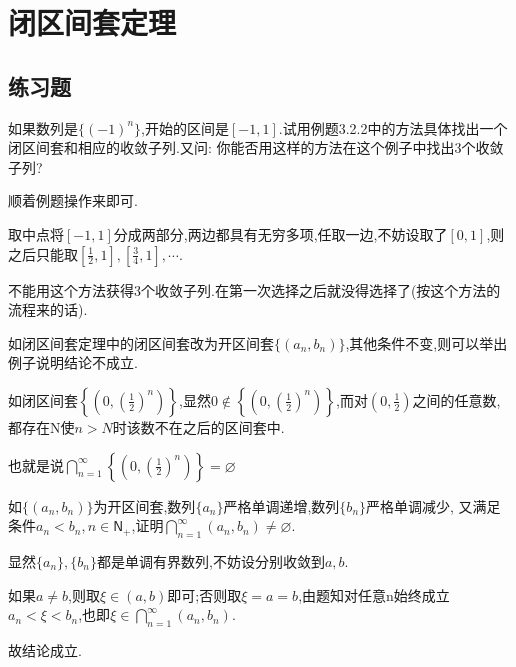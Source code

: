 \section{闭区间套定理}
    \subsection{练习题}
    \begin{exercise}
        如果数列是$\{(-1)^n\}$,开始的区间是$[-1,1]$.试用例题3.2.2中的方法具体找出一个闭区间套和相应的收敛子列.又问: 你能否用这样的方法在这个例子中找出3个收敛子列?
    \end{exercise}
    \begin{solution}
        顺着例题操作来即可.

        取中点将$[-1,1]$分成两部分,两边都具有无穷多项,任取一边,不妨设取了$[0,1]$,则之后只能取$[\frac{1}{2},1],[\frac{3}{4},1],\cdots$.

        不能用这个方法获得3个收敛子列.在第一次选择之后就没得选择了(按这个方法的流程来的话).
    \end{solution}

    \begin{exercise}
        如闭区间套定理中的闭区间套改为开区间套$\{(a_n,b_n)\}$,其他条件不变,则可以举出例子说明结论不成立.
    \end{exercise}
    \begin{solution}
        如闭区间套$\left\{(0,(\frac{1}{2})^n)\right\}$,显然$0\notin\left\{(0,(\frac{1}{2})^n)\right\}$,而对$(0,\frac{1}{2})$之间的任意数,都存在N使$n>N$时该数不在之后的区间套中.

        也就是说$\textstyle\bigcap_{n=1}^\infty\left\{(0,(\frac{1}{2})^n)\right\}=\varnothing $
    \end{solution}

    \begin{exercise}
        如$\{(a_n,b_n)\}$为开区间套,数列$\{a_n\}$严格单调递增,数列$\{b_n\}$严格单调减少,
        又满足条件$a_n<b_n,n\in \mathsf{N}_+$,证明$\textstyle\bigcap_{n=1}^\infty(a_n,b_n)\neq\varnothing$.
    \end{exercise}
    \begin{solution}
        显然$\{a_n\},\{b_n\}$都是单调有界数列,不妨设分别收敛到$a,b$.

        如果$a\neq b$,则取$\xi \in (a,b)$即可;否则取$\xi=a=b$,由题知对任意n始终成立$a_n<\xi<b_n$,也即$\xi\in\textstyle\bigcap_{n=1}^\infty(a_n,b_n)$.

        故结论成立.
    \end{solution}

